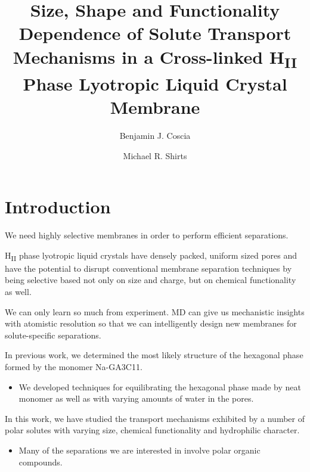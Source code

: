 \documentclass{article}
\title{Size, Shape and Functionality Dependence of Solute Transport Mechanisms in a Cross-linked H\textsubscript{II} Phase Lyotropic Liquid Crystal Membrane}
\author{Benjamin J. Coscia \and Michael R. Shirts}
\begin{document}
  \graphicspath{{./figures/}}
  \maketitle

  \section{Introduction}

  We need highly selective membranes in order to perform efficient separations.

  H\textsubscript{II} phase lyotropic liquid crystals have densely packed, uniform
  sized pores and have the potential to disrupt conventional membrane separation
  techniques by being selective based not only on size and charge, but on chemical
  functionality as well.

  We can only learn so much from experiment. MD can give us mechanistic insights with
  atomistic resolution so that we can intelligently design new membranes for 
  solute-specific separations.

  In previous work, we determined the most likely structure of the hexagonal phase 
  formed by the monomer Na-GA3C11.
  \begin{itemize}
  	\item We developed techniques for equilibrating the hexagonal phase made by
	neat monomer as well as with varying amounts of water in the pores.
  \end{itemize} 

  In this work, we have studied the transport mechanisms exhibited by a number
  of polar solutes with varying size, chemical functionality and hydrophilic character.
  \begin{itemize}
	\item Many of the separations we are interested in involve polar organic 
	compounds.
  \end{itemize} 
  
\end{document}
